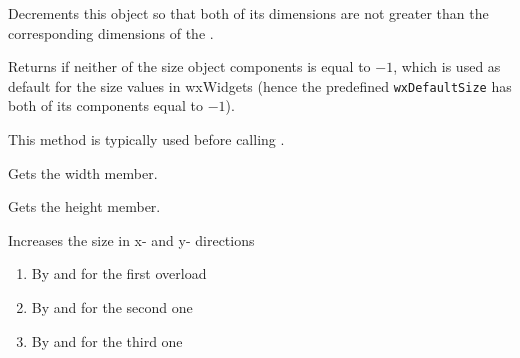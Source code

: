 


\label{wxsizedecto}


Decrements this object so that both of its dimensions are not greater than the
corresponding dimensions of the .




\label{wxsizeisfullyspecified}


Returns \true if neither of the size object components is equal to $-1$, which
is used as default for the size values in wxWidgets (hence the predefined
\texttt{wxDefaultSize} has both of its components equal to $-1$).

This method is typically used before calling
.


\label{wxsizegetwidth}


Gets the width member.


\label{wxsizegetheight}


Gets the height member.


\label{wxsizeincby}




Increases the size in x- and y- directions

\begin{enumerate}
    \item By  and  for the first overload
    \item By  and  for the second one
    \item By  and  for the third one
\end{enumerate}


